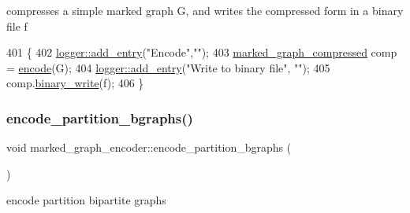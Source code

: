 compresses a simple marked graph G, and writes the compressed form in a binary file f 


\begin{DoxyCode}
401                                                                \{
402   \hyperlink{classlogger_a710163deb17bc81f70d53d285b8ac9ac}{logger::add\_entry}(\textcolor{stringliteral}{"Encode"},\textcolor{stringliteral}{""});
403   \hyperlink{classmarked__graph__compressed}{marked\_graph\_compressed} comp = \hyperlink{classmarked__graph__encoder_aa7fa19a225dd9b31d6fef9583fab8cf1}{encode}(G);
404   \hyperlink{classlogger_a710163deb17bc81f70d53d285b8ac9ac}{logger::add\_entry}(\textcolor{stringliteral}{"Write to binary file"}, \textcolor{stringliteral}{""});
405   comp.\hyperlink{classmarked__graph__compressed_ab9cdb7fc43badd58fb5202f74ffac723}{binary\_write}(f);
406 \}
\end{DoxyCode}
\mbox{\label{classmarked__graph__encoder_aa113c4870e3221faa332b2151b63d9e6}} 
\subsubsection{\texorpdfstring{encode\+\_\+partition\+\_\+bgraphs()}{encode\_partition\_bgraphs()}}
{\footnotesize\ttfamily void marked\+\_\+graph\+\_\+encoder\+::encode\+\_\+partition\+\_\+bgraphs (\begin{DoxyParamCaption}{ }\end{DoxyParamCaption})\hspace{0.3cm}{\ttfamily [private]}}



encode partition bipartite graphs 


